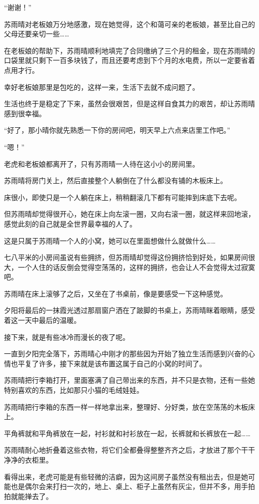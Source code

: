 “谢谢！”

苏雨晴对老板娘万分地感激，现在她觉得，这个和蔼可亲的老板娘，甚至比自己的父母还要亲切一些……

在老板娘的帮助下，苏雨晴顺利地填完了合同缴纳了三个月的租金，现在苏雨晴的口袋里就只剩下一百多块钱了，而且还要考虑到下个月的水电费，所以一定要省着点用才行。

幸好老板娘那里是包吃的，这样一来，生活下去就不成问题了。

生活也终于是稳定了下来，虽然会很艰苦，但是这样自食其力的艰苦，却让苏雨晴感到很幸福。

“好了，那小晴你就先熟悉一下你的房间吧，明天早上六点来店里工作吧。”

“嗯！”

老虎和老板娘都离开了，只有苏雨晴一人待在这小小的房间里。

苏雨晴将房门关上，然后直接整个人躺倒在了什么都没有铺的木板床上。

床很小，即使只是一个人躺在床上，稍稍翻滚几下都有可能摔到床底下去呢。

但苏雨晴却觉得很开心，她在床上向左滚一圈，又向右滚一圈，就这样来回地滚，感觉此刻的自己就是全世界最幸福的人了。

这是只属于苏雨晴一个人的小窝，她可以在里面想做什么就做什么……

七八平米的小房间虽说有些拥挤，但苏雨晴却觉得这份拥挤恰到好处，如果房间很大，一个人住的话反倒会觉得空荡荡的，这样的拥挤，也会让人不会觉得太过寂寞吧。

苏雨晴在床上滚够了之后，又坐在了书桌前，像是要感受一下这种感觉。

夕阳将最后的一抹霞光透过那扇窗户洒在了跛脚的书桌上，苏雨晴眯着眼睛，感受着这一天中最后的温暖。

接下来，就是有些冰冷而漫长的夜了呢。

一直到夕阳完全落下，苏雨晴心中刚才的那些因为开始了独立生活而感到兴奋的心情也平复了许多，接下来就是该布置这属于自己的小窝的时间了。

苏雨晴把行李箱打开，里面塞满了自己带出来的东西，并不只是衣物，还有一些她特别喜欢的东西，比如那只小猫的毛绒娃娃。

苏雨晴把行李箱的东西一样一样地拿出来，整理好、分好类，放在空荡荡的木板床上。

平角裤就和平角裤放在一起，衬衫就和衬衫放在一起，长裤就和长裤放在一起……

苏雨晴耐心地折叠着这些衣物，将它们全都叠得整整齐齐之后，才放进了那个干干净净的衣柜里。

看得出来，老虎可能是有些轻微的洁癖，因为这间房子虽然没有租出去，但是她可能也是偶尔会来打扫一次的，地上、桌上、柜子上虽然有灰尘，但并不多，用手拍拍就能掸去了。

